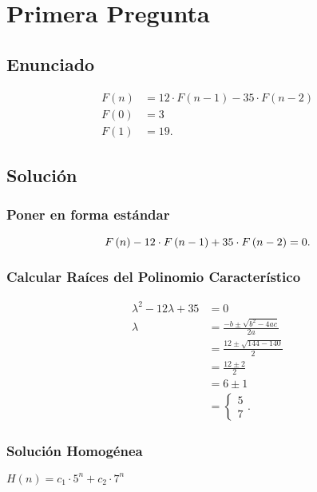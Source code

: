 


    

    \section*{Primera Pregunta}
    \subsection*{Enunciado}
    \begin{align*}
      F\left( n \right) &= 12\cdot F\left( n - 1 \right) - 35 \cdot F\left( n - 2 \right)\\
      F\left( 0 \right) &= 3\\
      F\left( 1 \right) &= 19
    .\end{align*}
    \subsection*{Solución}

    \subsubsection*{Poner en forma estándar}
    \[
    F\left( n \right) - 12\cdot F\left( n - 1 \right) + 35\cdot F\left( n - 2 \right)  = 0\\
    .\] 

    \subsubsection*{Calcular Raíces del Polinomio Característico}
    \begin{align*}
      \lambda^2 - 12 \lambda + 35 &= 0\\
      \lambda &= \frac{-b \pm \sqrt{b^2 - 4ac} }{2a} \\
      &= \frac{12 \pm \sqrt{144 - 140 } }{2} \\
      &= \frac{12 \pm 2}{2} \\
      &= 6 \pm 1 \\
      &= \begin{cases}
        5 \\
	7
      \end{cases}
    .\end{align*}

    \subsubsection*{Solución Homogénea}
    $H\left( n \right) = c_1\cdot 5^{n} + c_2\cdot 7^{n}$
